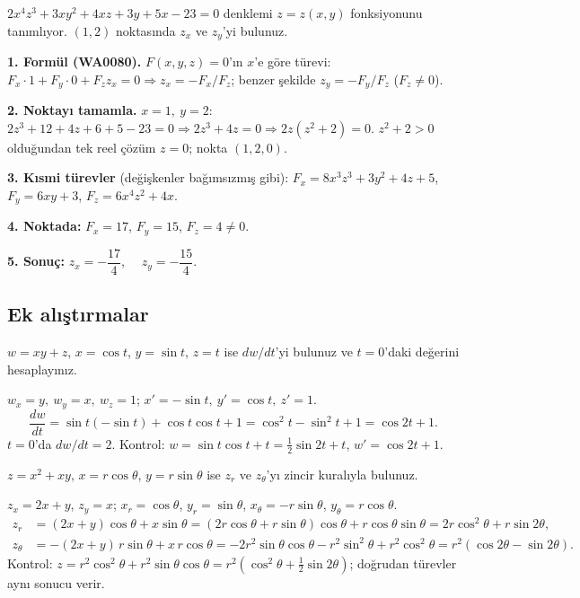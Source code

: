 \begin{soru}
$2x^4z^3+3xy^2+4xz+3y+5x-23=0$ denklemi $z=z(x,y)$ fonksiyonunu tanımlıyor. $(1,2)$ noktasında $z_x$ ve $z_y$'yi bulunuz.
\end{soru}
\begin{cevap}
\textbf{1. Formül (WA0080).} $F(x,y,z)=0$'ın $x$'e göre türevi: $F_x\cdot1+F_y\cdot0+F_zz_x=0\Rightarrow z_x=-F_x/F_z$;
benzer şekilde $z_y=-F_y/F_z$ ($F_z\ne0$).

\textbf{2. Noktayı tamamla.} $x=1,\ y=2$: $2z^3+12+4z+6+5-23=0\Rightarrow2z^3+4z=0\Rightarrow2z(z^2+2)=0$.
$z^2+2>0$ olduğundan tek reel çözüm $z=0$; nokta $(1,2,0)$.

\textbf{3. Kısmi türevler} (değişkenler bağımsızmış gibi):
$F_x=8x^3z^3+3y^2+4z+5$, $F_y=6xy+3$, $F_z=6x^4z^2+4x$.

\textbf{4. Noktada:} $F_x=17$, $F_y=15$, $F_z=4\ne0$.

\textbf{5. Sonuç:} $z_x=\boxed{-\dfrac{17}{4}}$, $\quad z_y=\boxed{-\dfrac{15}{4}}$.
\end{cevap}

\subsection{Ek alıştırmalar}

\begin{soru}
$w=xy+z$, $x=\cos t$, $y=\sin t$, $z=t$ ise $dw/dt$'yi bulunuz ve $t=0$'daki değerini hesaplayınız.
\end{soru}
\begin{cevap}
$w_x=y,\ w_y=x,\ w_z=1$; $x'=-\sin t,\ y'=\cos t,\ z'=1$.
\[
\frac{dw}{dt}=\sin t(-\sin t)+\cos t\cos t+1=\cos^2t-\sin^2t+1=\cos2t+1 .
\]
$t=0$'da $dw/dt=2$. Kontrol: $w=\sin t\cos t+t=\frac12\sin2t+t$, $w'=\cos2t+1$. \checkmark
\end{cevap}

\begin{soru}
$z=x^2+xy$, $x=r\cos\theta$, $y=r\sin\theta$ ise $z_r$ ve $z_\theta$'yı zincir kuralıyla bulunuz.
\end{soru}
\begin{cevap}
$z_x=2x+y$, $z_y=x$; $x_r=\cos\theta$, $y_r=\sin\theta$, $x_\theta=-r\sin\theta$, $y_\theta=r\cos\theta$.
\begin{align*}
z_r&=(2x+y)\cos\theta+x\sin\theta=(2r\cos\theta+r\sin\theta)\cos\theta+r\cos\theta\sin\theta
=2r\cos^2\theta+r\sin2\theta,\\
z_\theta&=-(2x+y)\,r\sin\theta+x\,r\cos\theta=-2r^2\sin\theta\cos\theta-r^2\sin^2\theta+r^2\cos^2\theta
=r^2(\cos2\theta-\sin2\theta).
\end{align*}
Kontrol: $z=r^2\cos^2\theta+r^2\sin\theta\cos\theta=r^2\left(\cos^2\theta+\tfrac12\sin2\theta\right)$; doğrudan türevler
aynı sonucu verir. \checkmark
\end{cevap}

